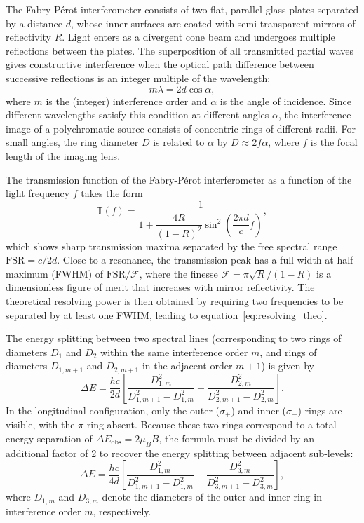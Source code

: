 \documentclass{article}
\begin{document}
The Fabry-Pérot interferometer consists of two flat, parallel glass plates separated by a distance $d$, whose inner surfaces are coated with semi-transparent mirrors of reflectivity $R$. Light enters as a divergent cone beam and undergoes multiple reflections between the plates. The superposition of all transmitted partial waves gives constructive interference when the optical path difference between successive reflections is an integer multiple of the wavelength:
\begin{equation}
    m\lambda = 2d\cos\alpha,
    \label{eq:interference_condition}
\end{equation}
where $m$ is the (integer) interference order and $\alpha$ is the angle of incidence. Since different wavelengths satisfy this condition at different angles $\alpha$, the interference image of a polychromatic source consists of concentric rings of different radii. For small angles, the ring diameter $D$ is related to $\alpha$ by $D \approx 2f\alpha$, where $f$ is the focal length of the imaging lens.

The transmission function of the Fabry-Pérot interferometer as a function of the light frequency $f$ takes the form
\begin{equation}
    \mathbb{T}(f) = \frac{1}{1 + \dfrac{4R}{(1-R)^2}\sin^2\!\left(\dfrac{2\pi d}{c}f\right)},
\end{equation}
which shows sharp transmission maxima separated by the free spectral range $\mathrm{FSR} = c/2d$. Close to a resonance, the transmission peak has a full width at half maximum (FWHM) of $\mathrm{FSR}/\mathcal{F}$, where the finesse $\mathcal{F} = \pi\sqrt{R}/(1-R)$ is a dimensionless figure of merit that increases with mirror reflectivity. The theoretical resolving power is then obtained by requiring two frequencies to be separated by at least one FWHM, leading to equation~\eqref{eq:resolving_theo}.

The energy splitting between two spectral lines (corresponding to two rings of diameters $D_1$ and $D_2$ within the same interference order $m$, and rings of diameters $D_{1,m+1}$ and $D_{2,m+1}$ in the adjacent order $m+1$) is given by
\begin{equation}
    \Delta E = \frac{hc}{2d}\left[\frac{D_{1,m}^2}{D_{1,m+1}^2 - D_{1,m}^2} - \frac{D_{2,m}^2}{D_{2,m+1}^2 - D_{2,m}^2}\right].
    \label{eq:delta_E_transversal}
\end{equation}
In the longitudinal configuration, only the outer ($\sigma_+$) and inner ($\sigma_-$) rings are visible, with the $\pi$ ring absent. Because these two rings correspond to a total energy separation of $\Delta E_\mathrm{obs} = 2\mu_B B$, the formula must be divided by an additional factor of 2 to recover the energy splitting between adjacent sub-levels:
\begin{equation}
    \Delta E = \frac{hc}{4d}\left[\frac{D_{1,m}^2}{D_{1,m+1}^2 - D_{1,m}^2} - \frac{D_{3,m}^2}{D_{3,m+1}^2 - D_{3,m}^2}\right],
    \label{eq:delta_E_longitudinal}
\end{equation}
where $D_{1,m}$ and $D_{3,m}$ denote the diameters of the outer and inner ring in interference order $m$, respectively.
\end{document}
